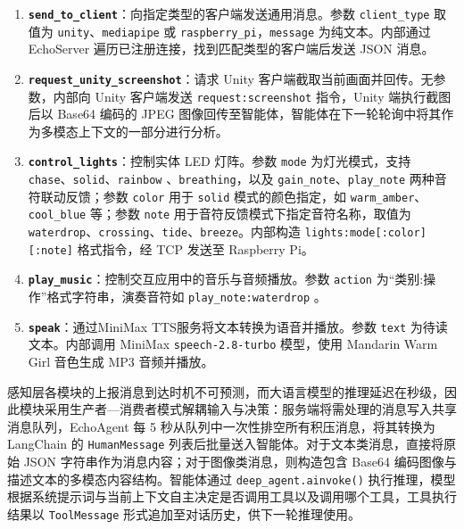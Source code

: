 \documentclass[bachelor]{njupthesis}
\begin{document}
\begin{enumerate}
\item \textbf{\texttt{send\_to\_client}}：向指定类型的客户端发送通用消息。参数 \texttt{client\_type} 取值为 \texttt{unity}、\texttt{mediapipe} 或 \texttt{raspberry\_pi}，\texttt{message} 为纯文本。内部通过 EchoServer 遍历已注册连接，找到匹配类型的客户端后发送 JSON 消息。

\item \textbf{\texttt{request\_unity\_screenshot}}：请求 Unity 客户端截取当前画面并回传。无参数，内部向 Unity 客户端发送 \texttt{request:screenshot} 指令，Unity 端执行截图后以 Base64 编码的 JPEG 图像回传至智能体，智能体在下一轮轮询中将其作为多模态上下文的一部分进行分析。

\item \textbf{\texttt{control\_lights}}：控制实体 LED 灯阵。参数 \texttt{mode} 为灯光模式，支持 \texttt{chase}、\texttt{solid}、\texttt{rainbow} 、\texttt{breathing}，以及 \texttt{gain\_note}、\texttt{play\_note} 两种音符联动反馈；参数 \texttt{color} 用于 \texttt{solid} 模式的颜色指定，如 \texttt{warm\_amber}、\texttt{cool\_blue} 等；参数 \texttt{note} 用于音符反馈模式下指定音符名称，取值为 \texttt{waterdrop}、\texttt{crossing}、\texttt{tide}、\texttt{breeze}。内部构造 \texttt{lights:mode[:color][:note]} 格式指令，经 TCP 发送至 Raspberry Pi。

\item \textbf{\texttt{play\_music}}：控制交互应用中的音乐与音频播放。参数 \texttt{action} 为“类别:操作”格式字符串，演奏音符如 \texttt{play\_note:waterdrop} 。

\item \textbf{\texttt{speak}}：通过MiniMax TTS服务将文本转换为语音并播放。参数 \texttt{text} 为待读文本。内部调用 MiniMax \texttt{speech-2.8-turbo} 模型，使用 Mandarin Warm Girl 音色生成 MP3 音频并播放。
\end{enumerate}

感知层各模块的上报消息到达时机不可预测，而大语言模型的推理延迟在秒级，因此模块采用生产者—消费者模式解耦输入与决策：服务端将需处理的消息写入共享消息队列，EchoAgent 每 5 秒从队列中一次性排空所有积压消息，将其转换为 LangChain 的 \texttt{HumanMessage} 列表后批量送入智能体。对于文本类消息，直接将原始 JSON 字符串作为消息内容；对于图像类消息，则构造包含 Base64 编码图像与描述文本的多模态内容结构。智能体通过 \texttt{deep\_agent.ainvoke()} 执行推理，模型根据系统提示词与当前上下文自主决定是否调用工具以及调用哪个工具，工具执行结果以 \texttt{ToolMessage} 形式追加至对话历史，供下一轮推理使用。
\end{document}

